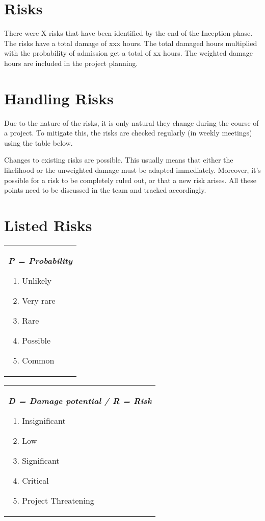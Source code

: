 \section{Risks}
There were X risks that have been identified by the end of the Inception phase.
The risks have a total damage of xxx hours. The total damaged hours multiplied
with the probability of admission get a total of xx hours. The weighted damage
hours are included in the project planning.

\section{Handling Risks}
Due to the nature of the risks, it is only natural they change during the course of a project.
To mitigate this, the risks are checked regularly (in weekly meetings) using the table below.

Changes to existing risks are possible. This usually means that either the likelihood or
the unweighted damage must be adapted immediately. Moreover, it's possible for a risk to
be completely ruled out, or that a new risk arises. All these points need to be discussed in
the team and tracked accordingly.

\section{Listed Risks}
\begin{tabular}[t]{@{}>{\raggedright}p{}}
  \textbf{\textit{P = Probability}}
  \begin{enumerate}[topsep=0pt,itemsep=-2pt,leftmargin=13pt]
  \item Unlikely
  \item Very rare
  \item Rare
  \item Possible
  \item Common
  \end{enumerate}
\end{tabular}
\begin{tabular}[t]{@{}>{\raggedright}p{}@{}}
  \textbf{\textit{D = Damage potential  / R = Risk}}
  \begin{enumerate}[topsep=0pt,itemsep=-2pt,leftmargin=13pt]
  \item Insignificant
  \item Low
  \item Significant
  \item Critical
  \item Project Threatening
  \end{enumerate}
\end{tabular}

